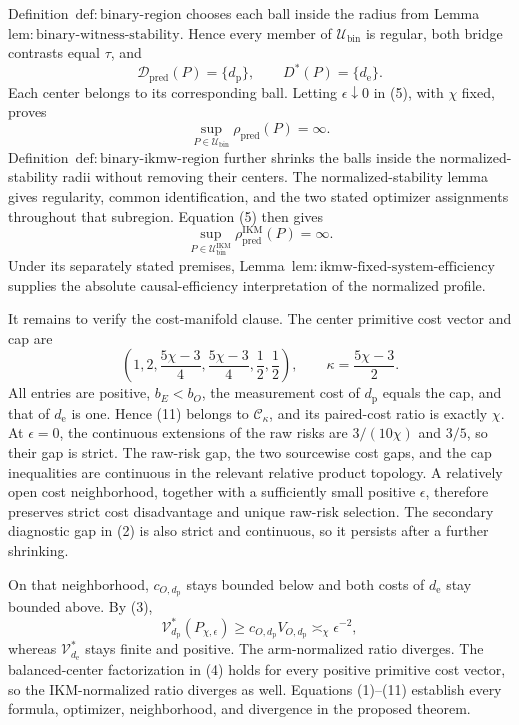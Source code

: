 Definition~\(\mathrm{def{:}binary\text{-}region}\) chooses each ball inside the radius from Lemma~\(\mathrm{lem{:}binary\text{-}witness\text{-}stability}\). Hence every member of \(\mathcal U_{\mathrm{bin}}\) is regular, both bridge contrasts equal \(\tau\), and
\[
 \mathcal D_{\mathrm{pred}}(P)=\{d_{\mathrm p}\},
 \qquad D^*(P)=\{d_{\mathrm e}\}. \tag{8}
\]
Each center belongs to its corresponding ball. Letting \(\epsilon\downarrow0\) in (5), with \(\chi\) fixed, proves
\[
 \sup_{P\in\mathcal U_{\mathrm{bin}}}\rho_{\mathrm{pred}}(P)=\infty. \tag{9}
\]
Definition~\(\mathrm{def{:}binary\text{-}ikmw\text{-}region}\) further shrinks the balls inside the normalized-stability radii without removing their centers. The normalized-stability lemma gives regularity, common identification, and the two stated optimizer assignments throughout that subregion. Equation (5) then gives
\[
 \sup_{P\in\mathcal U_{\mathrm{bin}}^{\mathrm{IKM}}}
 \rho_{\mathrm{pred}}^{\mathrm{IKM}}(P)=\infty. \tag{10}
\]
Under its separately stated premises, Lemma~\(\mathrm{lem{:}ikmw\text{-}fixed\text{-}system\text{-}efficiency}\) supplies the absolute causal-efficiency interpretation of the normalized profile.

It remains to verify the cost-manifold clause. The center primitive cost vector and cap are
\[
 \left(1,2,\frac{5\chi-3}{4},\frac{5\chi-3}{4},\frac12,\frac12\right),
 \qquad \kappa=\frac{5\chi-3}{2}. \tag{11}
\]
All entries are positive, \(b_E<b_O\), the measurement cost of \(d_{\mathrm p}\) equals the cap, and that of \(d_{\mathrm e}\) is one. Hence (11) belongs to \(\mathcal C_\kappa\), and its paired-cost ratio is exactly \(\chi\). At \(\epsilon=0\), the continuous extensions of the raw risks are \(3/(10\chi)\) and \(3/5\), so their gap is strict. The raw-risk gap, the two sourcewise cost gaps, and the cap inequalities are continuous in the relevant relative product topology. A relatively open cost neighborhood, together with a sufficiently small positive \(\epsilon\), therefore preserves strict cost disadvantage and unique raw-risk selection. The secondary diagnostic gap in (2) is also strict and continuous, so it persists after a further shrinking.

On that neighborhood, \(c_{O,d_{\mathrm p}}\) stays bounded below and both costs of \(d_{\mathrm e}\) stay bounded above. By (3),
\[
 \mathcal V_{d_{\mathrm p}}^*(P_{\chi,\epsilon})
 \ge c_{O,d_{\mathrm p}}V_{O,d_{\mathrm p}}\asymp_\chi\epsilon^{-2},
\]
whereas \(\mathcal V_{d_{\mathrm e}}^*\) stays finite and positive. The arm-normalized ratio diverges. The balanced-center factorization in (4) holds for every positive primitive cost vector, so the IKM-normalized ratio diverges as well. Equations (1)--(11) establish every formula, optimizer, neighborhood, and divergence in the proposed theorem.
